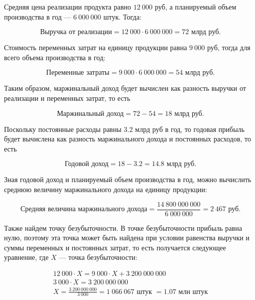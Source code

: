 Средняя цена реализации продукта равно $12\ 000$ руб, а планируемый объем производства в год --- $6\ 000\ 000$ штук. Тогда:

\begin{equation}
    \textbf{Выручка от реализации} = 12\ 000 \cdot 6\ 000\ 000 = 72 \text{ млрд руб.}
\end{equation}

Стоимость переменных затрат на единицу продукции равна $9\ 000$ руб, тогда для всего объема производства в год:

\begin{equation}
    \textbf{Переменные затраты} = 9\ 000 \cdot 6\ 000\ 000 = 54 \text{ млрд руб.}
\end{equation}

Таким образом, маржинальный доход будет вычислен как разность выручки от реализации и переменных затрат, то есть

\begin{equation}
    \textbf{Маржинальный доход} = 72 - 54 = 18 \text{ млрд руб.}
\end{equation}

Поскольку постоянные расходы равны $3.2$ млрд руб в год, то годовая прибыль будет вычислена как разность маржинального дохода и постоянных расходов, то есть

\begin{equation}
    \textbf{Годовой доход} = 18 - 3.2 = 14.8 \text{ млрд руб.}
\end{equation}

Зная годовой доход и планируемый объем производства в год, можно вычислить среднюю величину маржинального дохода на единицу продукции:

\begin{equation}
    \textbf{Средняя величина маржинального дохода} = \frac{14\ 800\ 000\ 000}{6\ 000\ 000}  = 2\ 467 \text{ руб.}
\end{equation}

Также найдем точку безубыточности. В точке безубыточности прибыль равна нулю, поэтому эта точка может быть найдена при условии равенства выручки и суммы переменных и постоянных затрат, то есть получается следующее уравнение, где $X$ --- точка безубыточности:

\begin{equation}
    \begin{gathered}
        12\ 000 \cdot X = 9\ 000 \cdot X + 3\ 200\ 000\ 000 
        \\ 3\ 000 \cdot X = 3\ 200\ 000\ 000 
        \\ X = \frac{3\ 200\ 000\ 000}{3\ 000} = 1\ 066\ 067 \text{  штук } = 1.07 \text{  млн штук}
    \end{gathered}
\end{equation}


